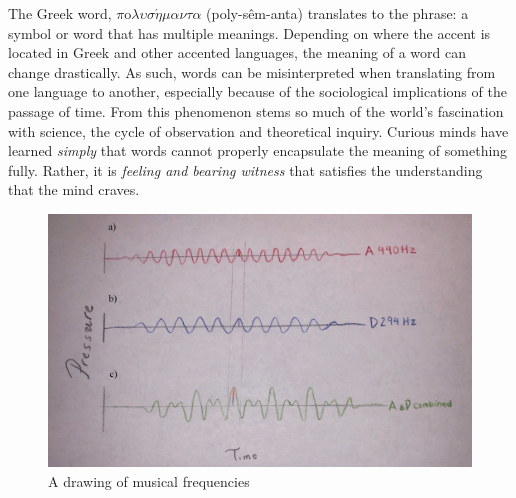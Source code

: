 \documentclass[12pt]{ucsddissertation}
\begin{document}
\mainmatter



\begin{dissertationintroduction}

The Greek word, $\pi$o$\lambda\upsilon\sigma\acute{\eta}\mu\alpha\nu\tau\alpha$ (poly-s\^em-anta) translates to the phrase: a symbol or word that has multiple meanings. Depending on where the accent is located in Greek and other accented languages, the meaning of a word can change drastically. As such, words can be misinterpreted when translating from one language to another, especially because of the sociological implications of the passage of time. From this phenomenon stems so much of the world's fascination with science, the cycle of observation and theoretical inquiry. Curious minds have learned \textit{simply} that words cannot properly encapsulate the meaning of something fully. Rather, it is \textit{feeling and bearing witness} that satisfies the understanding that the mind craves. 

\begin{figure}
\centering
	\includegraphics[scale=0.1]{frequencies.jpeg}
	\caption{A drawing of musical frequencies}
\label{fig:frequencies of music} 
\end{figure}


\end{dissertationintroduction}
\end{document}

